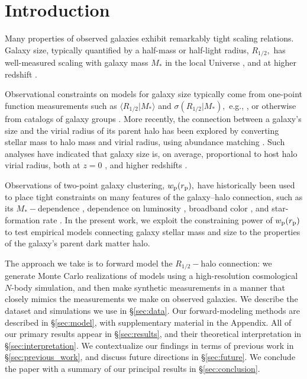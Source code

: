 \documentclass[usenatbib,usegraphicx,letterpaper]{mn2e}
\newcommand{\rhalf}{R_{1/2}}
\newcommand{\mstar}{M_{\ast}}
\newcommand{\rproj}{r_{\rm p}}
\newcommand{\wproj}{w_{\rm p}}
\newcommand{\mean}[2]{\langle{#1}\vert{#2}\rangle}
\begin{document}
\section{Introduction}
\label{sec:intro}

Many properties of observed galaxies exhibit remarkably tight scaling relations. Galaxy size, typically quantified by a half-mass or half-light radius, $\rhalf,$ has well-measured scaling with galaxy mass $\mstar$ in the local Universe \citep{shen_etal03,huang_etal13,lange_etal15,zhang_yang17}, and at higher redshift \citep{trujillo_etal04,huertas_company_etal13a,vanderwel_etal14,kawamata_etal15,shibuya_etal15,huang_etal17}.

Observational constraints on models for galaxy size typically come from one-point function measurements such as $\mean{\rhalf}{\mstar}$ and $\sigma(\rhalf\vert\mstar),$ e.g.,  \citet{khochfar_silk06,lang_etal14,desmond_etal17,bottrell_etal17b,hou_etal17,somerville_etal17}, or otherwise from catalogs of galaxy groups \citep{weinmann_etal08,guo_etal09,huertas_company_etal13b,spindler_wake17}. More recently, the connection between a galaxy's size and the virial radius of its parent halo has been
explored by converting stellar mass to halo mass and virial radius, using abundance matching \citep{kravtsov_etal04,tasitsiomi_etal04,vale_ostriker04,vale_ostriker06,conroy_etal06}.  Such analyses have indicated that galaxy size is, on average, proportional to host halo virial radius, both at $z=0$ \citep{kravtsov13}, and higher redshifts \citep{huang_etal17,somerville_etal17}.

Observations of two-point galaxy clustering, $\wproj(\rproj),$ have historically been used to place tight constraints on many features of the galaxy--halo connection, such as its $\mstar-$dependence \citep{moster_etal10,leauthaud_etal11,reddick_etal13,skibba_etal15}, dependence on luminosity \citep{kravtsov_etal04, tasitsiomi_etal04,vale_ostriker04,vale_ostriker06,tinker_etal05,cacciato_etal13}, broadband color \citep{coil_etal08,zehavi_etal11,guo_etal11,hearin_watson13}, and star-formation rate \citep{wang_etal07,tinker_etal13,watson_etal14}. In the present work, we exploit the constraining power of $\wproj(\rproj)$ to test empirical models connecting galaxy stellar mass and size to the properties of the galaxy's parent dark matter halo.

The approach we take is to forward model the $\rhalf-$halo connection: we generate Monte Carlo realizations of models using a high-resolution cosmological $N$-body simulation, and then make synthetic measurements in a manner that closely mimics the measurements we make on observed galaxies. We describe the dataset and simulations we use in \S\ref{sec:data}. Our forward-modeling methods are described in \S\ref{sec:model}, with supplementary material in the Appendix. All of our primary results appear in \S\ref{sec:results}, and their theoretical interpretation in \S\ref{sec:interpretation}. We contextualize our findings in terms of previous work in \S\ref{sec:previous_work}, and discuss future directions in \S\ref{sec:future}. We conclude the paper with a summary of our principal results in \S\ref{sec:conclusion}.
\end{document}
